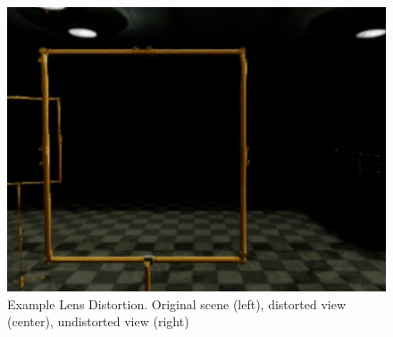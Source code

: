 \begin{figure}[htbp]
\begin{minipage}{0.33\textwidth}
		\includegraphics[width=\textwidth]{fig/gate_example_undistorted}
	\end{minipage}
	\caption{Example Lens Distortion. Original scene (left), distorted view (center), undistorted view (right)}
	\label{fig:distortion}
\end{figure}

